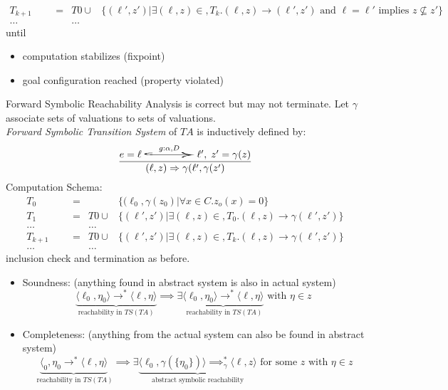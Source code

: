 \documentclass[a4paper, 10pt]{article}
\newcommand{\underbraceset}[2]{\underset{#1}{\underbrace{#2}}}
\begin{document}
\begin{mdframed}
\begin{align*}
T_{k+1} &&&= &T0\cup &\{(\ell',z') | \exists(\ell,z)\in,T_k.(\ell,z)\rightarrow(\ell',z') \text{ and } \ell=\ell' \text{ implies } z\not\subseteq z'\} \\
\dots &&& &\dots
\end{align*}
until
\begin{itemize}
    \item computation stabilizes (fixpoint)
    \item goal configuration reached (property violated)
\end{itemize}
Forward Symbolic Reachability Analysis is correct but may not terminate.
Let $\gamma$ associate sets of valuations to sets of valuations. \\
\emph{Forward Symbolic Transition System} of $TA$ is inductively defined by:
\[ \frac{
    e=\ell \overset{g:\alpha, D}{\scalebox{5}[1]{$\hookrightarrow$}} \ell',\; z'=\gamma(z)
}{
    (\ell,z)\Rightarrow \gamma(\ell',\gamma(z')
} \]
Computation Schema:
\begin{align*}
T_0 &&&= &&\{(\ell_0,\gamma(z_0) | \forall x\in C.z_o(x)=0\} \\
T_1 &&&= &T0\cup &\{(\ell',z') | \exists(\ell,z)\in,T_0.(\ell,z)\rightarrow\gamma(\ell',z') \} \\
\dots &&& &\dots \\
T_{k+1} &&&= &T0\cup &\{(\ell',z') | \exists(\ell,z)\in,T_k.(\ell,z)\rightarrow\gamma(\ell',z')\} \\
\dots &&& &\dots
\end{align*}
inclusion check and termination as before.
\begin{itemize}
    \item Soundness: (anything found in abstract system is also in actual system)
    \[
    \underbraceset{\text{reachability in } TS(TA)}{\langle\ell_0,\eta_0\rangle\to^*\langle\ell,\eta\rangle}
    \implies
    \exists\underbraceset{\text{ reachability in } TS(TA)}{\langle\ell_0,\eta_0\rangle\to^*\langle\ell,\eta\rangle} \text{ with } \eta\in z
     \]
    \item Completeness: (anything from the actual system can also be found in abstract system)
    \[
    \underbraceset{\text{ reachability in } TS(TA)}{\langle_0,\eta_0\to^*\langle\ell,\eta\rangle}
    \implies
     \exists\underbraceset{\text{abstract symbolic reachability}}{\langle\ell_0,\gamma(\{\eta_0\})\rangle\implies^*_\gamma\langle\ell,z\rangle} \text{ for some $z$ with } \eta\in z \]
\end{itemize}

\end{mdframed}
\end{document}
